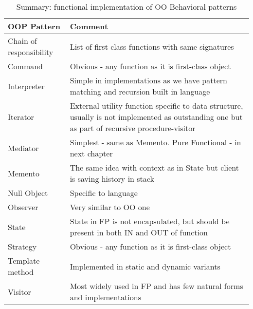 \begin{table}
    \begin{tabular}{ | l | p{10cm} |}
        \hline
        \hline
        OOP Pattern & Comment \\
        \hline
        \hline
            \cellcolor{green} Chain of responsibility  & List of first-class functions with same signatures \\ \hline
            \cellcolor{green} Command  & Obvious - any function as it is first-class object \\ \hline
            \cellcolor{green} Interpreter  & Simple in implementations as we have pattern matching and recursion built in language \\ \hline
            \cellcolor{green} Iterator & External utility function specific to data structure, usually is not implemented as outstanding one but as part of recursive procedure-visitor\\ \hline
            \cellcolor{green} Mediator & Simplest - same as Memento. Pure Functional - in next chapter \\ \hline
            \cellcolor{green} Memento & The same idea with context as in State but client is saving history in stack\\ \hline
            \cellcolor{green} Null Object & Specific to language \\ \hline
            \cellcolor{green} Observer & Very similar to OO one \\ \hline
            \cellcolor{green} State  & State in FP is not encapsulated, but should be present in both IN and OUT of function \\ \hline
            \cellcolor{green} Strategy & Obvious - any function as it is first-class object \\ \hline
            \cellcolor{green} Template method  & Implemented in static and dynamic variants \\ \hline
            \cellcolor{green} Visitor & Most widely used in FP and has few natural forms and implementations \\ \hline
        \hline
    \end{tabular}
    \caption{Summary: functional implementation of OO Behavioral patterns}
\end{table}


